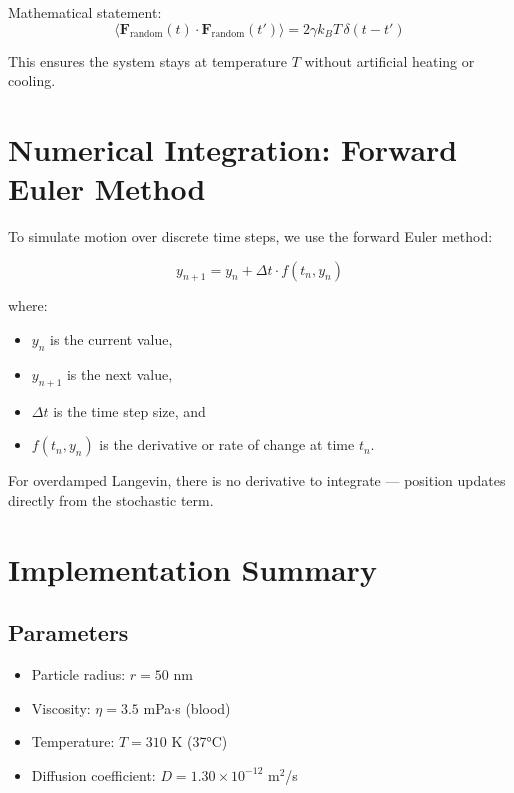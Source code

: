 \documentclass{article}
\begin{document}
Mathematical statement:
\[
\langle \mathbf{F}_{\text{random}}(t) \cdot \mathbf{F}_{\text{random}}(t') \rangle = 2\gamma k_B T \, \delta(t-t')
\]

This ensures the system stays at temperature $T$ without artificial heating or cooling.

\section{Numerical Integration: Forward Euler Method}

To simulate motion over discrete time steps, we use the forward Euler method:

\[
y_{n+1} = y_n + \Delta t \cdot f(t_n, y_n)
\]

where:
\begin{itemize}
    \item $y_n$ is the current value,
    \item $y_{n+1}$ is the next value,
    \item $\Delta t$ is the time step size, and
    \item $f(t_n, y_n)$ is the derivative or rate of change at time $t_n$.
\end{itemize}

For overdamped Langevin, there is no derivative to integrate — position updates directly from the stochastic term.

\section{Implementation Summary}

\subsection{Parameters}
\begin{itemize}
    \item Particle radius: $r = 50$ nm
    \item Viscosity: $\eta = 3.5$ mPa$\cdot$s (blood)
    \item Temperature: $T = 310$ K (37°C)
    \item Diffusion coefficient: $D = 1.30 \times 10^{-12}$ m$^2$/s
\end{itemize}
\end{document}
